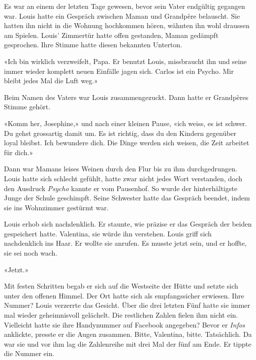 Es war an einem der letzten Tage gewesen, bevor sein Vater endgültig gegangen war. 
Louis hatte ein Gespräch zwischen Maman und Grandpère belauscht. 
Sie hatten ihn nicht in die Wohnung hochkommen hören, wähnten ihn wohl draussen am Spielen.
Louis’ Zimmertür hatte offen gestanden, Maman gedämpft gesprochen. Ihre Stimme hatte diesen bekannten Unterton.

«Ich bin wirklich verzweifelt, Papa. Er benutzt Louis, missbraucht ihn
und seine immer wieder komplett neuen Einfälle jagen sich. Carlos ist
ein Psycho. Mir bleibt jedes Mal die Luft weg.»

Beim Namen des Vaters war Louis zusammengezuckt. Dann hatte er
Grandpères Stimme gehört.

«Komm her, Josephine,» und nach einer kleinen Pause, «ich weiss, es ist
schwer. Du gehst grossartig damit um. Es ist richtig, dass du den
Kindern gegenüber loyal bleibst. Ich bewundere dich. Die Dinge werden
sich weisen, die Zeit arbeitet für dich.»

Dann war Mamans leises Weinen durch den Flur bis zu ihm
durchgedrungen. Louis hatte sich schlecht gefühlt, hatte zwar nicht
jedes Wort verstanden, doch den Ausdruck \emph{Psycho} kannte er vom Pausenhof. So
wurde der hinterhältigste Junge der Schule geschimpft. Seine Schwester hatte das Gespräch beendet, 
indem sie ins Wohnzimmer gestürmt war.

\sectionbreak

Louis erhob sich nachdenklich. Er staunte, wie präzise er das Gespräch der beiden gespeichert hatte. 
Valentina, sie würde ihn verstehen. Louis griff sich nachdenklich ins Haar. Er wollte
sie anrufen. Es musste jetzt sein, und er hoffte, sie sei noch wach.

«Jetzt.»

Mit festen Schritten begab er sich auf die Westseite der Hütte und
setzte sich unter den offenen Himmel. Der Ort hatte sich als
empfangssicher erwiesen. Ihre Nummer? Louis verzerrte das Gesicht. Über
die drei letzten Fünf hatte sie immer mal wieder geheimnisvoll
gelächelt. Die restlichen Zahlen fielen ihm nicht ein. Vielleicht hatte sie ihre Handynummer
auf Facebook angegeben? Bevor er \emph{Infos} anklickte, presste er die Augen
zusammen. Bitte, Valentina, bitte. Tatsächlich. Da war sie und vor ihm
lag die Zahlenreihe mit drei Mal der fünf am Ende. Er tippte die Nummer
ein.
